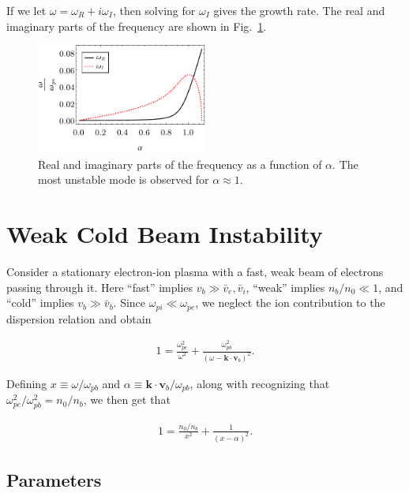 \documentclass[12pt]{article}
\newcommand{\mb}{\mathbf}
\begin{document}


If we let $\omega = \omega_R+i \omega_I$, then solving for $\omega_I$ gives the growth rate. The real and imaginary parts of the frequency are shown in Fig.~\ref{fig:omega_roots}.

\begin{figure}
	\centering
	\includegraphics[width=0.5\textwidth]{omega_roots}
	\caption{\label{fig:omega_roots} Real and imaginary parts of the frequency as a function of $\alpha$. The most unstable mode is observed for $\alpha \approx 1$.}
\end{figure}

\section*{Weak Cold Beam Instability}
Consider a stationary electron-ion plasma with a fast, weak beam of electrons passing through it. Here ``fast'' implies $v_b \gg \bar{v}_e, \bar{v}_i$, ``weak'' implies $n_b/n_0 \ll 1$, and ``cold'' implies $v_b \gg \bar{v}_b$. Since $\omega_{pi} \ll \omega_{pe}$, we neglect the ion contribution to the dispersion relation and obtain

\begin{align*}
1 = \frac{\omega_{pe}^2}{\omega^2} + \frac{\omega_{pb}^2}{(\omega-\mb{k} \cdot \mb{v}_b)^2}.
\end{align*}

Defining $x \equiv \omega/\omega_{pb}$ and $\alpha \equiv \mb{k} \cdot \mb{v}_b/\omega_{pb}$, along with recognizing that $\omega_{pe}^2/\omega_{pb}^2 = n_0/n_b$, we then get that

\begin{align*}
1 = \frac{n_0/n_b}{x^2} + \frac{1}{(x-\alpha)^2}.
\end{align*}

\subsection*{Parameters}
\end{document}
